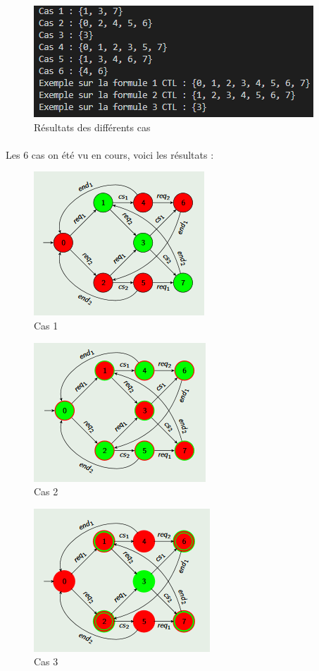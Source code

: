\documentclass[12pt,a4paper]{report}
\begin{document}
\begin{figure}[H]
  \centering
      \includegraphics[scale=1]{Images/resultats_test.PNG}
  \caption{Résultats des différents cas}
\end{figure}

\paragraph{}Les 6 cas on été vu en cours, voici les résultats :

\begin{figure}[H]
  \centering
      \includegraphics[scale=1]{Images/cas1.PNG}
  \caption{Cas 1}
\end{figure}

\begin{figure}[H]
  \centering
      \includegraphics[scale=1]{Images/cas2.PNG}
  \caption{Cas 2}
\end{figure}

\begin{figure}[H]
  \centering
      \includegraphics[scale=1]{Images/cas3.PNG}
  \caption{Cas 3}
\end{figure}
\end{document}
